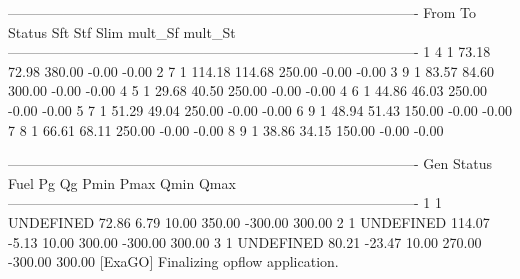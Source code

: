 ----------------------------------------------------------------------------------------
From       To       Status     Sft      Stf     Slim     mult_Sf  mult_St 
----------------------------------------------------------------------------------------
1          4          1       73.18    72.98   380.00    -0.00    -0.00
2          7          1      114.18   114.68   250.00    -0.00    -0.00
3          9          1       83.57    84.60   300.00    -0.00    -0.00
4          5          1       29.68    40.50   250.00    -0.00    -0.00
4          6          1       44.86    46.03   250.00    -0.00    -0.00
5          7          1       51.29    49.04   250.00    -0.00    -0.00
6          9          1       48.94    51.43   150.00    -0.00    -0.00
7          8          1       66.61    68.11   250.00    -0.00    -0.00
8          9          1       38.86    34.15   150.00    -0.00    -0.00

----------------------------------------------------------------------------------------
Gen      Status     Fuel     Pg       Qg       Pmin     Pmax     Qmin     Qmax  
----------------------------------------------------------------------------------------
1          1    UNDEFINED    72.86     6.79    10.00   350.00  -300.00   300.00
2          1    UNDEFINED   114.07    -5.13    10.00   300.00  -300.00   300.00
3          1    UNDEFINED    80.21   -23.47    10.00   270.00  -300.00   300.00
[ExaGO] Finalizing opflow application.
